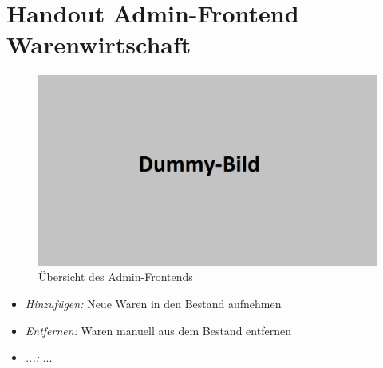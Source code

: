







\section*{Handout Admin-Frontend Warenwirtschaft}

\begin{figure}[H]
	\begin{center}
	\includegraphics[width=0.65 \textwidth]{./dummy.png}
	\end{center}
	\caption{Übersicht des Admin-Frontends}
\end{figure}


\begin{itemize}
	\item \textit{Hinzufügen:} Neue Waren in den Bestand aufnehmen
	\item \textit{Entfernen:} Waren manuell aus dem Bestand entfernen
	\item \textit{...:} ...
	
\end{itemize}



